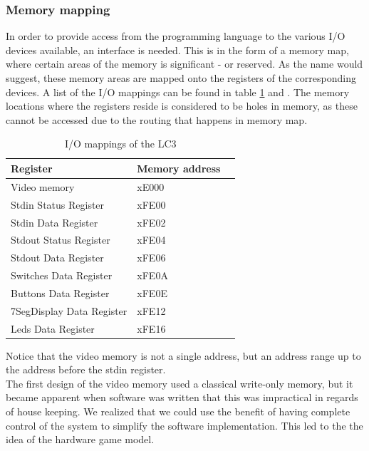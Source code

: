 \documentclass{acm_proc_article-sp}
\begin{document}
\subsubsection{Memory mapping}
In order to provide access from the programming language to the various I/O devices available, an interface is needed. This is in the form of a memory map, where certain areas of the memory is significant - or reserved. As the name would suggest, these memory areas are mapped onto the registers of the corresponding devices. A list of the I/O mappings can be found in table \ref{table:io_mappings} and \cite{patt2000introduction}. The memory locations where the registers reside is considered to be holes in memory, as these cannot be accessed due to the routing that happens in memory map.
\begin{table}[h]
\centering
    \begin{tabular}{ | l | l | l |}
    \hline
     Register & Memory address \\ \hline 
    \hline
    Video memory           & xE000  \\ \hline
    Stdin Status Register  & xFE00  \\ \hline
    Stdin Data Register    & xFE02  \\ \hline
    Stdout Status Register & xFE04  \\ \hline
    Stdout Data Register   & xFE06  \\ \hline
    Switches Data Register & xFE0A  \\ \hline
    Buttons Data Register  & xFE0E  \\ \hline
    7SegDisplay Data Register  & xFE12  \\ \hline
    Leds Data Register  & xFE16  \\ \hline
    \end{tabular}
\caption{I/O mappings of the LC3}
\label{table:io_mappings}
\end{table}
Notice that the video memory is not a single address, but an address range up to the address before the stdin register.\\
The first design of the video memory used a classical write-only memory, but it became apparent when software was written that this was impractical in regards of house keeping. We realized that we could use the benefit of having complete control of the system to simplify the software implementation. This led to the the idea of the hardware game model.
\end{document}
